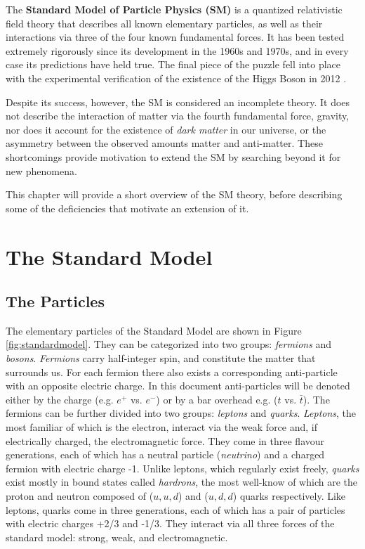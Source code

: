 \label{chapter:theory}

\newlength{\savedunitlength}
\setlength{\unitlength}{2em}

The \textbf{Standard Model of Particle Physics (SM)} \cite{peskin,schwartz,pdg_rev,Griffiths} is a quantized relativistic field theory that describes all known elementary particles, as well as their interactions via three of the four known fundamental forces. It has been tested extremely rigorously since its development in the 1960s and 1970s, and in every case its predictions have held true. The final piece of the puzzle fell into place with the experimental verification of the existence of the Higgs Boson in 2012 \cite{HiggsDiscovery}.

Despite its success, however, the SM is considered an incomplete theory. It does not describe the interaction of matter via the fourth fundamental force, gravity, nor does it account for the existence of \textit{dark matter} in our universe, or the asymmetry between the observed amounts matter and anti-matter. These shortcomings provide motivation to extend the SM by searching beyond it for new phenomena.

This chapter will provide a short overview of the SM theory, before describing some of the deficiencies that motivate an extension of it.

\section{The Standard Model}

\subsection{The Particles}
The elementary particles of the Standard Model are shown in Figure \ref{fig:standardmodel}. They can be categorized into two groups: \textit{fermions} and \textit{bosons}. \textit{Fermions} carry half-integer spin, and constitute the matter that surrounds us. For each fermion there also exists a corresponding anti-particle with an opposite electric charge. In this document anti-particles will be denoted either by the charge (e.g. $e^{+}$ vs. $e^{-}$) or by a bar overhead e.g. ($t$ vs. $\bar{t}$). The fermions can be further divided into two groups: \textit{leptons} and \textit{quarks}. \textit{Leptons}, the most familiar of which is the electron, interact via the weak force and, if electrically charged, the electromagnetic force. They come in three flavour generations, each of which has a neutral particle (\textit{neutrino}) and a charged fermion with electric charge -1. Unlike leptons, which regularly exist freely, \textit{quarks} exist mostly in bound states called \textit{hardrons}, the most well-know of which are the proton and neutron composed of ($u,u,d$) and ($u,d,d$) quarks respectively. Like leptons, quarks come in three generations, each of which has a pair of particles with electric charges +2/3 and -1/3. They interact via all three forces of the standard model: strong, weak, and electromagnetic.

